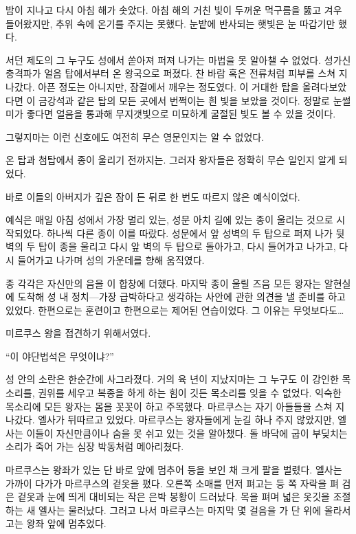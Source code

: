 밤이 지나고 다시 아침 해가 솟았다. 아침 해의 거친 빛이 두꺼운 먹구름을 뚫고 겨우 들어왔지만, 추위 속에 온기를 주지는 못했다. 눈밭에 반사되는 햇빛은 눈 따갑기만 했다.

서던 제도의 그 누구도 성에서 쏟아져 퍼져 나가는 마법을 못 알아챌 수 없었다. 성가신 충격파가 얼음 탑에서부터 온 왕국으로 퍼졌다. 찬 바람 혹은 전류처럼 피부를 스쳐 지나갔다. 아픈 정도는 아니지만, 잠결에서 깨우는 정도였다. 이 거대한 탑을 올려다보았다면 이 금강석과 같은 탑의 모든 곳에서 번쩍이는 흰 빛을 보았을 것이다. 정말로 눈썰미가 좋다면 얼음을 통과해 무지갯빛으로 미묘하게 굴절된 빛도 볼 수 있을 것이다.

그렇지마는 이런 신호에도 여전히 무슨 영문인지는 알 수 없었다.

온 탑과 첨탑에서 종이 울리기 전까지는. 그러자 왕자들은 정확히 무슨 일인지 알게 되었다.

바로 이들의 아버지가 깊은 잠이 든 뒤로 한 번도 따르지 않은 예식이었다.

예식은 매일 아침 성에서 가장 멀리 있는, 성문 아치 길에 있는 종이 울리는 것으로 시작되었다. 하나씩 다른 종이 이를 따랐다. 성문에서 앞 성벽의 두 탑으로 퍼져 나가 뒷벽의 두 탑이 종을 울리고 다시 앞 벽의 두 탑으로 돌아가고, 다시 들어가고 나가고, 다시 들어가고 나가며 성의 가운데를 향해 움직였다.

종 각각은 자신만의 음을 이 합창에 더했다. 마지막 종이 울릴 즈음 모든 왕자는 알현실에 도착해 성 내 정치—가장 급박하다고 생각하는 사안에 관한 의견을 낼 준비를 하고 있었다. 한편으로는 훈련이고 한편으로는 제어된 연습이었다. 그 이유는 무엇보다도\ldots

미르쿠스 왕을 접견하기 위해서였다.

``이 야단법석은 무엇이냐?''

성 안의 소란은 한순간에 사그라졌다. 거의 육 년이 지났지마는 그 누구도 이 강인한 목소리를, 권위를 세우고 복종을 하게 하는 힘이 깃든 목소리를 잊을 수 없었다. 익숙한 목소리에 모든 왕자는 몸을 꼿꼿이 하고 주목했다. 마르쿠스는 자기 아들들을 스쳐 지나갔다. 엘사가 뒤따르고 있었다. 마르쿠스는 왕자들에게 눈길 하나 주지 않았지만, 엘사는 이들이 자신만큼이나 숨을 못 쉬고 있는 것을 알아챘다. 돌 바닥에 굽이 부딪치는 소리가 죽어 가는 심장 박동처럼 메아리쳤다.

마르쿠스는 왕좌가 있는 단 바로 앞에 멈추어 등을 보인 채 크게 팔을 벌렸다. 엘사는 가까이 다가가 마르쿠스의 겉옷을 폈다. 오른쪽 소매를 먼저 펴고는 등 쪽 자락을 펴 검은 겉옷과 눈에 띄게 대비되는 작은 은박 봉황이 드러났다. 목을 펴며 넓은 옷깃을 조절하는 새 엘사는 물러났다. 그러고 나서 마르쿠스는 마지막 몇 걸음을 가 단 위에 올라서고는 왕좌 앞에 멈추었다.

